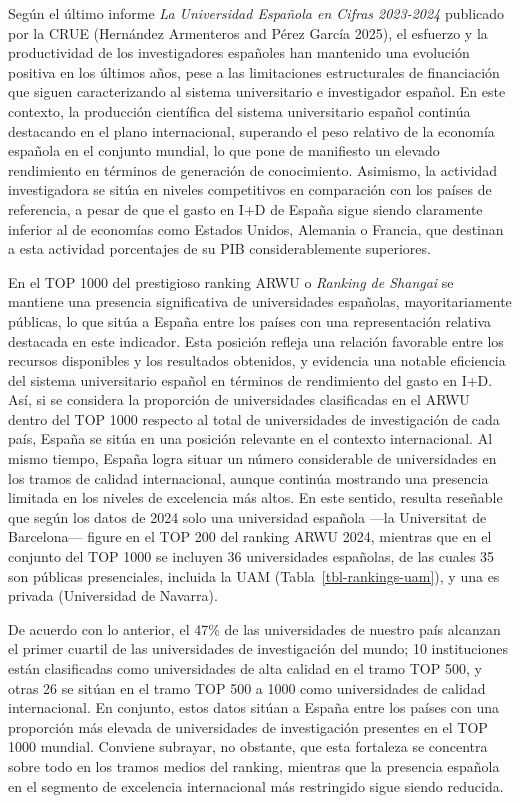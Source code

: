 \documentclass[
  11pt,
  a4paper,
  twoside]{scrreprt}
\begin{document}
Según el último informe \emph{La Universidad Española en Cifras
2023-2024} publicado por la CRUE (Hernández Armenteros and Pérez García
2025), el esfuerzo y la productividad de los investigadores españoles
han mantenido una evolución positiva en los últimos años, pese a las
limitaciones estructurales de financiación que siguen caracterizando al
sistema universitario e investigador español. En este contexto, la
producción científica del sistema universitario español continúa
destacando en el plano internacional, superando el peso relativo de la
economía española en el conjunto mundial, lo que pone de manifiesto un
elevado rendimiento en términos de generación de conocimiento. Asimismo,
la actividad investigadora se sitúa en niveles competitivos en
comparación con los países de referencia, a pesar de que el gasto en I+D
de España sigue siendo claramente inferior al de economías como Estados
Unidos, Alemania o Francia, que destinan a esta actividad porcentajes de
su PIB considerablemente superiores.

En el TOP 1000 del prestigioso ranking ARWU o \emph{Ranking de Shangai}
se mantiene una presencia significativa de universidades españolas,
mayoritariamente públicas, lo que sitúa a España entre los países con
una representación relativa destacada en este indicador. Esta posición
refleja una relación favorable entre los recursos disponibles y los
resultados obtenidos, y evidencia una notable eficiencia del sistema
universitario español en términos de rendimiento del gasto en I+D. Así,
si se considera la proporción de universidades clasificadas en el ARWU
dentro del TOP 1000 respecto al total de universidades de investigación
de cada país, España se sitúa en una posición relevante en el contexto
internacional. Al mismo tiempo, España logra situar un número
considerable de universidades en los tramos de calidad internacional,
aunque continúa mostrando una presencia limitada en los niveles de
excelencia más altos. En este sentido, resulta reseñable que según los
datos de 2024 solo una universidad española ---la Universitat de
Barcelona--- figure en el TOP 200 del ranking ARWU 2024, mientras que en
el conjunto del TOP 1000 se incluyen 36 universidades españolas, de las
cuales 35 son públicas presenciales, incluida la UAM
(Tabla~\ref{tbl-rankings-uam}), y una es privada (Universidad de
Navarra).

De acuerdo con lo anterior, el 47\% de las universidades de nuestro país
alcanzan el primer cuartil de las universidades de investigación del
mundo; 10 instituciones están clasificadas como universidades de alta
calidad en el tramo TOP 500, y otras 26 se sitúan en el tramo TOP 500 a
1000 como universidades de calidad internacional. En conjunto, estos
datos sitúan a España entre los países con una proporción más elevada de
universidades de investigación presentes en el TOP 1000 mundial.
Conviene subrayar, no obstante, que esta fortaleza se concentra sobre
todo en los tramos medios del ranking, mientras que la presencia
española en el segmento de excelencia internacional más restringido
sigue siendo reducida.
\end{document}

